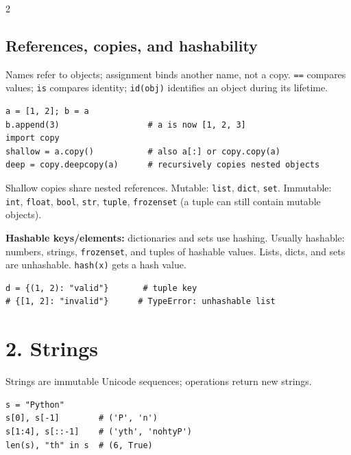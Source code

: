 \documentclass[10pt,a4paper]{article}
\newcommand{\py}[1]{\texttt{#1}}
\begin{document}
\begin{multicols}{2}
\subsection{References, copies, and hashability}

Names refer to objects; assignment binds another name, not a copy. \py{==} compares values; \py{is} compares identity; \py{id(obj)} identifies an object during its lifetime.

\begin{lstlisting}
a = [1, 2]; b = a
b.append(3)                  # a is now [1, 2, 3]
import copy
shallow = a.copy()           # also a[:] or copy.copy(a)
deep = copy.deepcopy(a)      # recursively copies nested objects
\end{lstlisting}

Shallow copies share nested references. Mutable: \py{list}, \py{dict}, \py{set}. Immutable: \py{int}, \py{float}, \py{bool}, \py{str}, \py{tuple}, \py{frozenset} (a tuple can still contain mutable objects).

\textbf{Hashable keys/elements:} dictionaries and sets use hashing. Usually hashable: numbers, strings, \py{frozenset}, and tuples of hashable values. Lists, dicts, and sets are unhashable. \py{hash(x)} gets a hash value.

\begin{lstlisting}
d = {(1, 2): "valid"}       # tuple key
# {[1, 2]: "invalid"}      # TypeError: unhashable list
\end{lstlisting}

\section{2. Strings}

Strings are immutable Unicode sequences; operations return new strings.

\begin{lstlisting}
s = "Python"
s[0], s[-1]        # ('P', 'n')
s[1:4], s[::-1]    # ('yth', 'nohtyP')
len(s), "th" in s  # (6, True)
\end{lstlisting}


\end{multicols}
\end{document}
